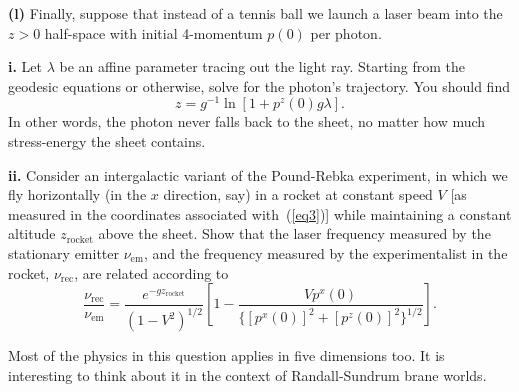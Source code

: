 \documentclass[a4paper]{article} %
\begin{document}
\begin{framed}
\textbf{(l)} Finally, suppose that instead of a tennis ball we launch a laser beam into the $z > 0$ half-space with initial 4-momentum $p(0)$ per photon.
\end{framed}

\begin{framed}
\textbf{i.} Let $\lambda$ be an affine parameter tracing out the light ray. Starting from the geodesic equations or otherwise, solve for the photon’s trajectory. You should find
\begin{equation}
z=g^{-1}\ln[1+p^z(0)g\lambda].
\end{equation}
In other words, the photon never falls back to the sheet, no matter how much stress-energy the sheet contains.
\end{framed}

\begin{framed}
\textbf{ii.} Consider an intergalactic variant of the Pound-Rebka experiment, in which we fly horizontally (in the $x$ direction, say) in a rocket at constant speed $V$ [as measured in the coordinates associated with~(\ref{eq3})] while maintaining a constant altitude $z_{\text{rocket}}$ above the sheet. Show that the laser frequency measured by the stationary emitter $\nu_{\text{em}}$, and the frequency measured by the experimentalist in the rocket, $\nu_{\text{rec}}$, are related according to
\begin{equation}
\frac{\nu_{\text{rec}}}{\nu_{\text{em}}}=\frac{e^{-gz_{\text{rocket}}}}{(1-V^2)^{1/2}}
\left[1-\frac{Vp^x(0)}{\{[p^x(0)]^2+[p^z(0)]^2\}^{1/2}}\right].
\end{equation}

Most of the physics in this question applies in five dimensions too. It is interesting to think about it in the context of Randall-Sundrum brane worlds.
\end{framed}
\end{document}

